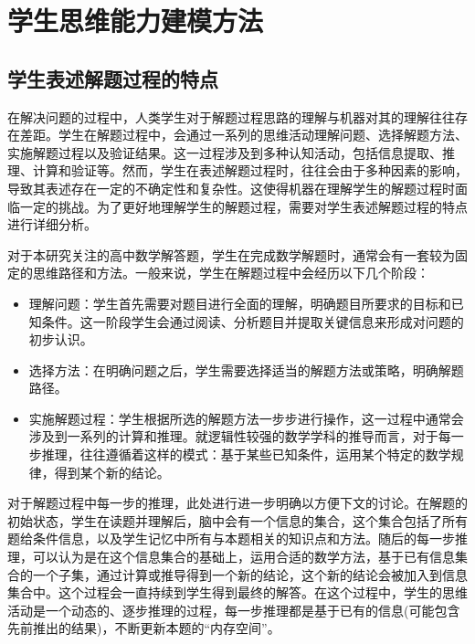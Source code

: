 
\chapter{学生思维能力建模方法}

\section{学生表述解题过程的特点}

在解决问题的过程中，人类学生对于解题过程思路的理解与机器对其的理解往往存在差距。学生在解题过程中，会通过一系列的思维活动理解问题、选择解题方法、实施解题过程以及验证结果。这一过程涉及到多种认知活动，包括信息提取、推理、计算和验证等。然而，学生在表述解题过程时，往往会由于多种因素的影响，导致其表述存在一定的不确定性和复杂性。这使得机器在理解学生的解题过程时面临一定的挑战。为了更好地理解学生的解题过程，需要对学生表述解题过程的特点进行详细分析。

对于本研究关注的高中数学解答题，学生在完成数学解题时，通常会有一套较为固定的思维路径和方法。一般来说，学生在解题过程中会经历以下几个阶段：

\begin{itemize}
    \item 理解问题：学生首先需要对题目进行全面的理解，明确题目所要求的目标和已知条件。这一阶段学生会通过阅读、分析题目并提取关键信息来形成对问题的初步认识。
    \item 选择方法：在明确问题之后，学生需要选择适当的解题方法或策略，明确解题路径。
    \item 实施解题过程：学生根据所选的解题方法一步步进行操作，这一过程中通常会涉及到一系列的计算和推理。就逻辑性较强的数学学科的推导而言，对于每一步推理，往往遵循着这样的模式：基于某些已知条件，运用某个特定的数学规律，得到某个新的结论。
\end{itemize}

对于解题过程中每一步的推理，此处进行进一步明确以方便下文的讨论。在解题的初始状态，学生在读题并理解后，脑中会有一个信息的集合，这个集合包括了所有题给条件信息，以及学生记忆中所有与本题相关的知识点和方法。随后的每一步推理，可以认为是在这个信息集合的基础上，运用合适的数学方法，基于已有信息集合的一个子集，通过计算或推导得到一个新的结论，这个新的结论会被加入到信息集合中。这个过程会一直持续到学生得到最终的解答。在这个过程中，学生的思维活动是一个动态的、逐步推理的过程，每一步推理都是基于已有的信息(可能包含先前推出的结果)，不断更新本题的“内存空间”。

